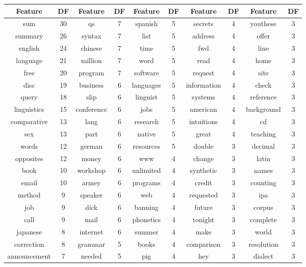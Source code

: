 \documentclass[10pt, a4paper]{article}
\begin{document}
\begin{tabular}{|c|c||c|c||c|c||c|c||c|c|}\centering

Feature & DF & Feature & DF & Feature & DF & Feature & DF & Feature & DF \\
\hline
sum & 30 & qs & 7 & spanish & 5 & secrets & 4 & youthese & 3 \\
summary & 26 & syntax & 7 & list & 5 & address & 4 & offer & 3 \\
english & 24 & chinese & 7 & time & 5 & fwd & 4 & line & 3 \\
language & 21 & million & 7 & word & 5 & read & 4 & home & 3 \\
free & 20 & program & 7 & software & 5 & request & 4 & site & 3 \\
disc & 19 & business & 6 & languages & 5 & information & 4 & check & 3 \\
query & 18 & slip & 6 & linguist & 5 & systems & 4 & reference & 3 \\
linguistics & 15 & conference & 6 & jobs & 5 & american & 4 & background & 3 \\
comparative & 13 & lang & 6 & research & 5 & intuitions & 4 & cd & 3 \\
sex & 13 & part & 6 & native & 5 & great & 4 & teaching & 3 \\
words & 12 & german & 6 & resources & 5 & double & 3 & decimal & 3 \\
opposites & 12 & money & 6 & www & 4 & change & 3 & latin & 3 \\
book & 10 & workshop & 6 & unlimited & 4 & synthetic & 3 & names & 3 \\
email & 10 & armey & 6 & programs & 4 & credit & 3 & counting & 3 \\
method & 9 & speaker & 6 & web & 4 & requested & 3 & ipa & 3 \\
job & 9 & dick & 6 & banning & 4 & future & 3 & corpus & 3 \\
call & 9 & mail & 6 & phonetics & 4 & tonight & 3 & complete & 3 \\
japanese & 8 & internet & 6 & summer & 4 & make & 3 & world & 3 \\
correction & 8 & grammar & 5 & books & 4 & comparison & 3 & resolution & 3 \\
announcement & 7 & needed & 5 & pig & 4 & hey & 3 & dialect & 3 \\
\hline

\end{tabular}
\end{document}
